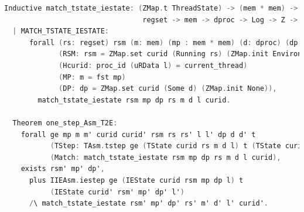 \begin{lstlisting}[language=C]
  Inductive match_tstate_iestate: (ZMap.t ThreadState) -> (mem * mem) -> (ZMap.t (option dproc)) ->
                                 regset -> mem -> dproc -> Log -> Z -> Prop :=
  | MATCH_TSTATE_IESTATE:
      forall (rs: regset) rsm (m: mem) (mp : mem * mem) (d: dproc) (dp : ZMap.t (option dproc)) curid l
             (RSM: rsm = ZMap.set curid (Running rs) (ZMap.init Environment))
             (Hcurid: proc_id (uRData l) = current_thread)
             (MP: m = fst mp)
             (DP: dp = ZMap.set curid (Some d) (ZMap.init None)),        
        match_tstate_iestate rsm mp dp rs m d l curid.

  Theorem one_step_Asm_T2E:
    forall ge mp m m' curid curid' rsm rs rs' l l' dp d d' t
           (TStep: TAsm.tstep ge (TState curid rs m d l) t (TState curid' rs' m' d' l'))
           (Match: match_tstate_iestate rsm mp dp rs m d l curid),
    exists rsm' mp' dp',
      plus IIEAsm.iestep ge (IEState curid rsm mp dp l) t
           (IEState curid' rsm' mp' dp' l')
      /\ match_tstate_iestate rsm' mp' dp' rs' m' d' l' curid'.
\end{lstlisting}

